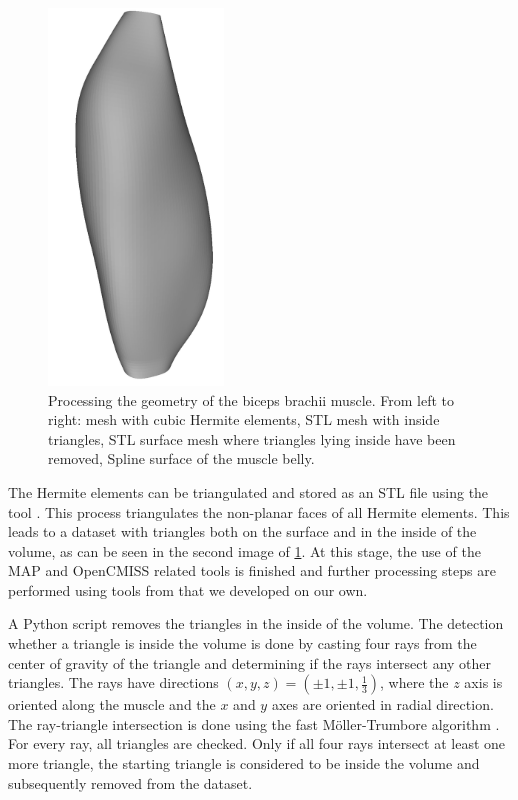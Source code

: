 \begin{figure}
  \includegraphics[height=10cm,trim=-2cm 0 0 -2cm, clip]{images/fiber_creation/splines00.png}%
  \caption{Processing the geometry of the biceps brachii muscle. From left to right: mesh with cubic Hermite elements, STL mesh with inside triangles, STL surface mesh where triangles lying inside have been removed, Spline surface of the muscle belly.}%
  \label{fig:biceps_processing}%
\end{figure}%

The Hermite elements can be triangulated and stored as an STL file using the tool \mbox{.} This process triangulates the non-planar faces of all Hermite elements. This leads to a dataset with triangles both on the surface and in the inside of the volume, as can be seen in the second image of \cref{fig:biceps_processing}. At this stage, the use of the MAP and OpenCMISS related tools is finished and further processing steps are performed using tools from \opendihu{} that we developed on our own.

A Python script removes the triangles in the inside of the volume. The detection whether a triangle is inside the volume is done by casting four rays from the center of gravity of the triangle and determining if the rays intersect any other triangles. The rays have directions $(x,y,z) = (\pm1,\pm1,\frac13)$, where the $z$ axis is oriented along the muscle and the $x$ and $y$ axes are oriented in radial direction. The ray-triangle intersection is done using the fast Möller-Trumbore algorithm \cite{ray-triangle}. For every ray, all triangles are checked.
Only if all four rays intersect at least one more triangle, the starting triangle is considered to be inside the volume and subsequently removed from the dataset. 

